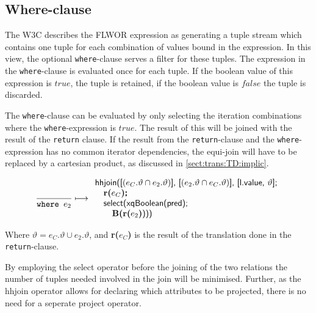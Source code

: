 \subsection{Where-clause}
The W3C describes the FLWOR expression as generating a tuple stream which contains one tuple for each combination
of values bound in the expression\cite{w3c00}. In this view, the optional \texttt{where}-clause serves a filter
for these tuples. The expression in the \texttt{where}-clause is evaluated once for each tuple. If the boolean
value of this expression is $true$, the tuple is retained, if the boolean value is $false$ the tuple is discarded.

The \texttt{where}-clause can be evaluated by only selecting the iteration combinations where the
\texttt{where}-expression is $true$. The result of this will be joined with the result of the \texttt{return}
clause. If the result from the \texttt{return}-clause and the \texttt{where}-expression has no common iterator
dependencies, the equi-join will have to be replaced by a cartesian product, as discussed in
\ref{sect:trans:TD:implic}.

\begin{equation}
\frac{}{\mbox{\texttt{where }}e_2}\longmapsto
\begin{array}{l}
\mbox{\textsf{hhjoin([}}(e_{C}.\vartheta \cap e_2.\vartheta)\mbox{\textsf{], [}}(e_{2}.\vartheta \cap
e_{C}.\vartheta)\mbox{\textsf{], [l.value, }} \vartheta\mbox{\textsf{];}} \\ \quad
\mbox{\textbf{r(}}e_{C}\mbox{\textbf{)\textsf{;}}} \\ \quad
\mbox{\textsf{select(xqBoolean(pred);}} \\ \quad \quad
\mbox{\textbf{B(r(}}e_{2}\mbox{\textbf{)}\textsf{)))}}
\end{array}
\label{rule:trans:TD:where}
\end{equation}

Where $\vartheta = e_{C}.\vartheta \cup e_{2}.\vartheta$, and \textbf{r(}$e_{C}$\textbf{)} is the result of the
translation done in the \texttt{return}-clause.

By employing the \textsf{select} operator before the joining of the two relations the number of tuples needed
involved in the join will be minimised. Further, as the \textsf{hhjoin} operator allows for declaring which
attributes to be projected, there is no need for a seperate \textsf{project} operator.

